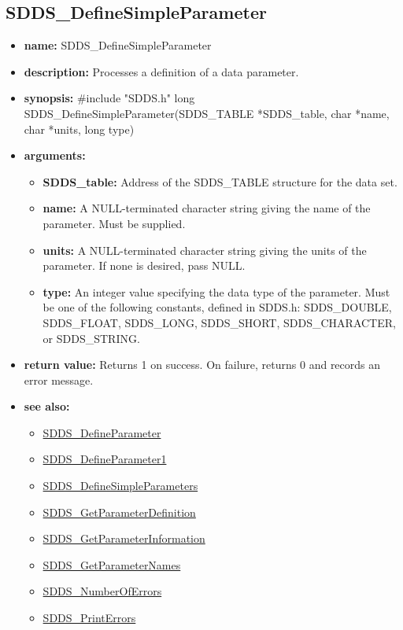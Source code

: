 \documentclass[11pt]{article}
\newcommand{\progref}[1]{\hyperref{SDDS_#1}{{\tt SDDS\_#1} (}{)}{SDDS_#1}}
\begin{document}
\subsection{SDDS\_DefineSimpleParameter}
\label{SDDS_DefineSimpleParameter}

\begin{itemize}
\item {\bf name:}\newline
SDDS\_DefineSimpleParameter
\item {\bf description:}\newline
Processes a definition of a data parameter.
\item {\bf synopsis:} \#include "SDDS.h"\newline
long SDDS\_DefineSimpleParameter(SDDS\_TABLE *SDDS\_table, char *name, char *units, long type)
\item {\bf arguments:}
\begin{itemize}
\item {\bf SDDS\_table:} Address of the SDDS\_TABLE structure for the data set.
\item {\bf name:} A NULL-terminated character string giving the name of the parameter. Must be supplied.
\item {\bf units:} A NULL-terminated character string giving the units of the parameter. If none is desired, pass NULL.
\item {\bf type:} An integer value specifying the data type of the parameter. Must be one of the following constants, defined in  SDDS.h: SDDS\_DOUBLE, SDDS\_FLOAT, SDDS\_LONG, SDDS\_SHORT, SDDS\_CHARACTER, or SDDS\_STRING.
\end{itemize}
\item {\bf return value:}\newline
Returns 1 on success. On failure, returns 0 and records an error message.
\item {\bf see also:}
\begin{itemize}
\item \progref{DefineParameter}
\item \progref{DefineParameter1}
\item \progref{DefineSimpleParameters}
\item \progref{GetParameterDefinition}
\item \progref{GetParameterInformation}
\item \progref{GetParameterNames}
\item \progref{NumberOfErrors}
\item \progref{PrintErrors}
\end{itemize}
\end{itemize}
\end{document}
